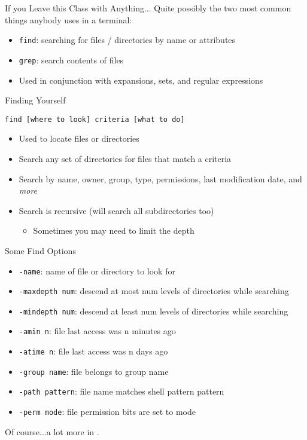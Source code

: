 \begin{frame}[fragile]{If you Leave this Class with Anything...}
  Quite possibly the two most common things anybody uses in a terminal:

  \begin{itemize}[<+- | alert@+>]
    \item \texttt{find}: searching for files / directories by name or attributes
    \item \texttt{grep}: search contents of files
    \item Used in conjunction with expansions, sets, and regular expressions
  \end{itemize}
\end{frame}

\begin{frame}[fragile]{Finding Yourself}
  \begin{block}{}
    \texttt{find [where to look] criteria [what to do]}
    \begin{itemize}
      \item Used to locate files or directories
      \item Search any set of directories for files that match a criteria
      \item Search by name, owner, group, type, permissions, last modification date, and \emph{more}
      \item Search is recursive (will search all subdirectories too)
      \begin{itemize}
        \item Sometimes you may need to limit the depth
      \end{itemize}
    \end{itemize}
  \end{block}
\end{frame}

\begin{frame}[fragile]{Some Find Options}
  \begin{itemize}
    \item \texttt{-name}: name of file or directory to look for
    \item \texttt{-maxdepth num}: descend at most num levels of directories while searching
    \item \texttt{-mindepth num}: descend at least num levels of directories while searching
    \item \texttt{-amin n}: file last access was n minutes ago
    \item \texttt{-atime n}: file last access was n days ago
    \item \texttt{-group name}: file belongs to group name
    \item \texttt{-path pattern}: file name matches shell pattern pattern
    \item \texttt{-perm mode}: file permission bits are set to mode
  \end{itemize}

  Of course...a lot more in .
\end{frame}


